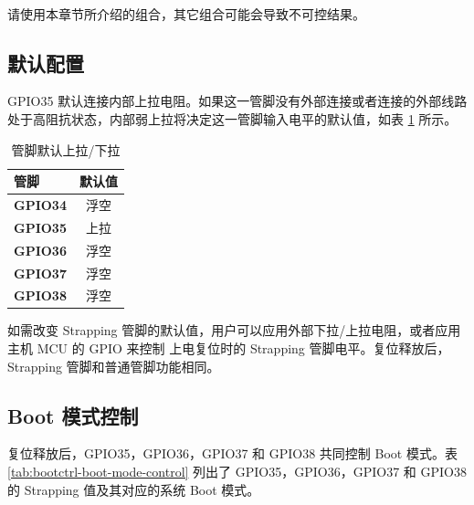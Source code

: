 \documentclass[main\_\_CN.tex]{subfiles}
\begin{document}
\begin{importantlisting}\\
请使用本章节所介绍的组合，其它组合可能会导致不可控结果。
\end{importantlisting}

\subsection{默认配置}

GPIO35 默认连接内部上拉电阻。如果这一管脚没有外部连接或者连接的外部线路处于高阻抗状态，内部弱上拉将决定这一管脚输入电平的默认值，如表 \ref{tab:bootctrl-default-config-strapping-pins} 所示。

\newpage
\begin{longtable}[c]{|p{1.5cm}|c|}
\caption{管脚默认上拉/下拉}
\label{tab:bootctrl-default-config-strapping-pins} \\
    \hline
    \rowcolor{lightgray}
  \textbf{管脚} & \textbf{默认值} \\ \hline
  \textbf{GPIO34} & 浮空 \\ \hline
  \textbf{GPIO35} & 上拉 \\ \hline
  \textbf{GPIO36} & 浮空 \\ \hline
  \textbf{GPIO37} & 浮空  \\ \hline
  \textbf{GPIO38} & 浮空 \\ \hline
\end{longtable}

如需改变 Strapping 管脚的默认值，用户可以应用外部下拉/上拉电阻，或者应用主机 MCU 的 GPIO 来控制 \chipname{} 上电复位时的 Strapping 管脚电平。复位释放后，Strapping 管脚和普通管脚功能相同。

\subsection{Boot 模式控制}

复位释放后，GPIO35，GPIO36，GPIO37 和 GPIO38 共同控制 Boot 模式。表 \ref{tab:bootctrl-boot-mode-control} 列出了 GPIO35，GPIO36，GPIO37 和 GPIO38 的 Strapping 值及其对应的系统 Boot 模式。
\end{document}
